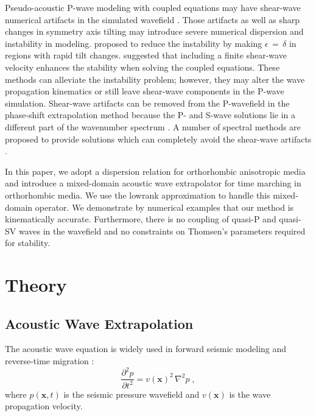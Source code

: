 Pseudo-acoustic P-wave modeling with coupled equations may have shear-wave numerical artifacts in the simulated wavefield \cite[]{grechkat,zhang2,duveneckt}.
Those artifacts as well as sharp changes in symmetry axis tilting may introduce severe numerical 
dispersion and instability in modeling. 
\cite{yoon} proposed to reduce the instability by making $\epsilon \,=\, \delta$ in regions 
with rapid tilt changes. 
\cite{fletcher} suggested that including a finite shear-wave velocity enhances the stability 
when solving the coupled equations.
These methods can alleviate the instability problem; 
however, they may alter the wave propagation kinematics or still leave shear-wave components in the P-wave simulation. 
Shear-wave artifacts can be removed from the P-wavefield in the phase-shift extrapolation method because the P- and S-wave solutions lie in a different part of the wavenumber spectrum \cite[]{bale}.
A number of spectral methods are proposed to provide solutions 
which can completely avoid the shear-wave artifacts \cite[]{etgen,songx,lr,songxl,chu,ge,fowlerg}. 


 
In this paper, we adopt a dispersion relation for orthorhombic
anisotropic media \cite[]{alkaor} and introduce a mixed-domain
acoustic wave extrapolator for time marching in orthorhombic media.
We use the lowrank approximation \cite[]{ying,lr} to handle this
mixed-domain operator.
We demonstrate by
numerical examples that our method is kinematically accurate.
Furthermore, there is no coupling of quasi-P and quasi-SV waves in the
wavefield and no constraints on Thomsen's parameters required for
stability.
 

\section{Theory}

\subsection{Acoustic Wave Extrapolation}
The acoustic wave equation is widely used in
forward seismic modeling and reverse-time migration \cite[]{bednar,etgen1}:
\begin{equation}
\label{eq:acoustic} 
\frac{\partial^2p}{\partial t^2} = v(\mathbf{x})^2\,\nabla^2p\;,
\end{equation}
where $p(\mathbf{x},t)$ is the seismic pressure wavefield
and $v(\mathbf{x})$ is the wave propagation velocity.\\

